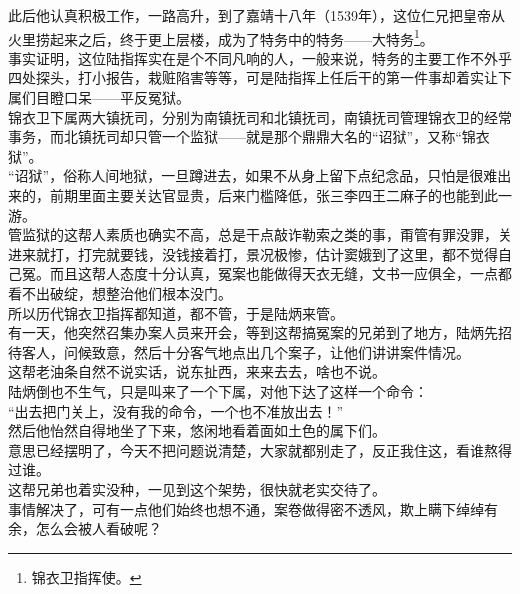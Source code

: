 \begin{multicols}{\theparacolNo}
此后他认真积极工作，一路高升，到了嘉靖十八年（1539年），这位仁兄把皇帝从火里捞起来之后，终于更上层楼，成为了特务中的特务——大特务\footnote{锦衣卫指挥使。}。\\

事实证明，这位陆指挥实在是个不同凡响的人，一般来说，特务的主要工作不外乎四处探头，打小报告，栽赃陷害等等，可是陆指挥上任后干的第一件事却着实让下属们目瞪口呆——平反冤狱。\\

锦衣卫下属两大镇抚司，分别为南镇抚司和北镇抚司，南镇抚司管理锦衣卫的经常事务，而北镇抚司却只管一个监狱——就是那个鼎鼎大名的“诏狱”，又称“锦衣狱”。\\

“诏狱”，俗称人间地狱，一旦蹲进去，如果不从身上留下点纪念品，只怕是很难出来的，前期里面主要关达官显贵，后来门槛降低，张三李四王二麻子的也能到此一游。\\

管监狱的这帮人素质也确实不高，总是干点敲诈勒索之类的事，甭管有罪没罪，关进来就打，打完就要钱，没钱接着打，景况极惨，估计窦娥到了这里，都不觉得自己冤。而且这帮人态度十分认真，冤案也能做得天衣无缝，文书一应俱全，一点都看不出破绽，想整治他们根本没门。\\

所以历代锦衣卫指挥都知道，都不管，于是陆炳来管。\\

有一天，他突然召集办案人员来开会，等到这帮搞冤案的兄弟到了地方，陆炳先招待客人，问候致意，然后十分客气地点出几个案子，让他们讲讲案件情况。\\

这帮老油条自然不说实话，说东扯西，来来去去，啥也不说。\\

陆炳倒也不生气，只是叫来了一个下属，对他下达了这样一个命令：\\

“出去把门关上，没有我的命令，一个也不准放出去！”\\

然后他怡然自得地坐了下来，悠闲地看着面如土色的属下们。\\

意思已经摆明了，今天不把问题说清楚，大家就都别走了，反正我住这，看谁熬得过谁。\\

这帮兄弟也着实没种，一见到这个架势，很快就老实交待了。\\

事情解决了，可有一点他们始终也想不通，案卷做得密不透风，欺上瞒下绰绰有余，怎么会被人看破呢？\\


\end{multicols}
